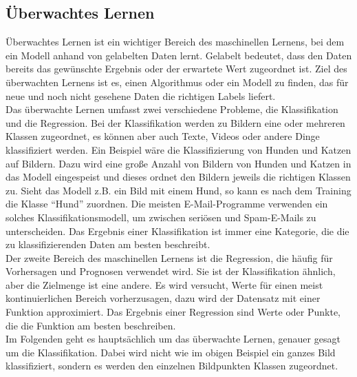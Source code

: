 \subsection{Überwachtes Lernen}
\label{sec:ÜberwachtesLernen}
Überwachtes Lernen ist ein wichtiger Bereich des maschinellen Lernens, bei dem ein \gls{Modell} anhand von gelabelten Daten lernt. Gelabelt bedeutet, dass den Daten bereits das gewünschte Ergebnis oder der erwartete Wert zugeordnet ist. Ziel des überwachten Lernens ist es, einen \gls{Algorithmus} oder ein \gls{Modell} zu finden, das für neue und noch nicht gesehene Daten die richtigen Labels liefert.\cite[vgl.][]{Frochte2020,IBMSupervisedLearning} \\
Das überwachte Lernen umfasst zwei verschiedene Probleme, die Klassifikation und die Regression. Bei der Klassifikation werden zu Bildern eine oder mehreren Klassen zugeordnet, es können aber auch Texte, Videos oder andere Dinge klassifiziert werden. Ein Beispiel wäre die Klassifizierung von Hunden und Katzen auf Bildern. Dazu wird eine große Anzahl von Bildern von Hunden und Katzen in das \gls{Modell} eingespeist und dieses ordnet den Bildern jeweils die richtigen Klassen zu. Sieht das \gls{Modell} z.B. ein Bild mit einem Hund, so kann es nach dem Training die Klasse ``Hund'' zuordnen. Die meisten E-Mail-Programme verwenden ein solches Klassifikationsmodell, um zwischen seriösen und Spam-E-Mails zu unterscheiden. Das Ergebnis einer Klassifikation ist immer eine Kategorie, die die zu klassifizierenden Daten am besten beschreibt. \\
Der zweite Bereich des maschinellen Lernens ist die Regression, die häufig für Vorhersagen und Prognosen verwendet wird.  Sie ist der Klassifikation ähnlich, aber die Zielmenge ist eine andere. Es wird versucht, Werte für einen meist kontinuierlichen Bereich vorherzusagen, dazu wird der Datensatz mit einer Funktion approximiert. Das Ergebnis einer Regression sind Werte oder Punkte, die die Funktion am besten beschreiben.\cite[vgl.][]{Frochte2020} \\
Im Folgenden geht es hauptsächlich um das überwachte Lernen, genauer gesagt um die Klassifikation. Dabei wird nicht wie im obigen Beispiel ein ganzes Bild klassifiziert, sondern es werden den einzelnen Bildpunkten Klassen zugeordnet.

